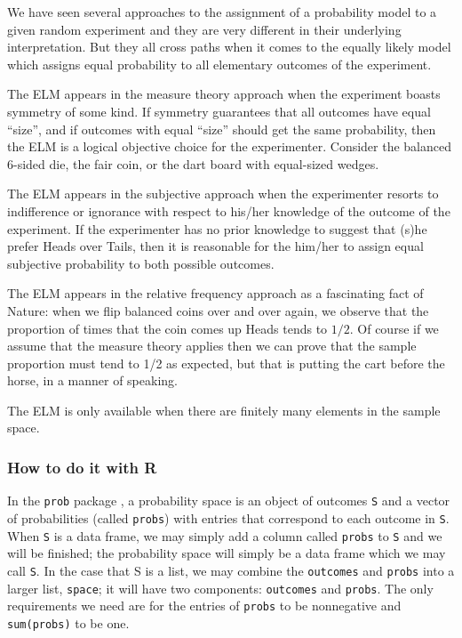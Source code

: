 \documentclass[]{book}
\numberwithin{equation}{chapter}
\numberwithin{figure}{chapter}
\theoremstyle{plain}
\theoremstyle{definition}
\theoremstyle{remark}
\theoremstyle{definition}
\theoremstyle{definition}
\theoremstyle{remark}
\begin{document}
We have seen several approaches to the assignment of a probability model
to a given random experiment and they are very different in their
underlying interpretation. But they all cross paths when it comes to the
equally likely model which assigns equal probability to all elementary
outcomes of the experiment.

The ELM appears in the measure theory approach when the experiment
boasts symmetry of some kind. If symmetry guarantees that all outcomes
have equal ``size'', and if outcomes with equal ``size'' should get the
same probability, then the ELM is a logical objective choice for the
experimenter. Consider the balanced 6-sided die, the fair coin, or the
dart board with equal-sized wedges.

The ELM appears in the subjective approach when the experimenter resorts
to indifference or ignorance with respect to his/her knowledge of the
outcome of the experiment. If the experimenter has no prior knowledge to
suggest that (s)he prefer Heads over Tails, then it is reasonable for
the him/her to assign equal subjective probability to both possible
outcomes.

The ELM appears in the relative frequency approach as a fascinating fact
of Nature: when we flip balanced coins over and over again, we observe
that the proportion of times that the coin comes up Heads tends to
\(1/2\). Of course if we assume that the measure theory applies then we
can prove that the sample proportion must tend to 1/2 as expected, but
that is putting the cart before the horse, in a manner of speaking.

The ELM is only available when there are finitely many elements in the
sample space.

\subsubsection{How to do it with R}\label{how-to-do-it-with-r-11}

In the \texttt{prob} package \autocite{prob}, a probability space is an
object of outcomes \texttt{S} and a vector of probabilities (called
\texttt{probs}) with entries that correspond to each outcome in
\texttt{S}. When \texttt{S} is a data frame, we may simply add a column
called \texttt{probs} to \texttt{S} and we will be finished; the
probability space will simply be a data frame which we may call
\texttt{S}. In the case that S is a list, we may combine the
\texttt{outcomes} and \texttt{probs} into a larger list, \texttt{space};
it will have two components: \texttt{outcomes} and \texttt{probs}. The
only requirements we need are for the entries of \texttt{probs} to be
nonnegative and \texttt{sum(probs)} to be one.
\end{document}
